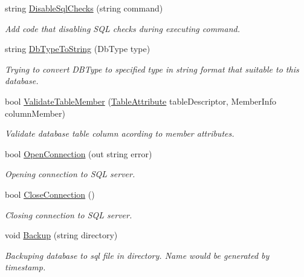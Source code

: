 \begin{DoxyCompactItemize}
string \mbox{\hyperlink{interface_uniform_data_operator_1_1_sql_1_1_i_sql_operator_a0757f304a24ffaa743e23e8bdd210950}{Disable\+Sql\+Checks}} (string command)
\begin{DoxyCompactList}\small\item\em Add code that disabling S\+QL checks during executing command. \end{DoxyCompactList}\item 
string \mbox{\hyperlink{interface_uniform_data_operator_1_1_sql_1_1_i_sql_operator_a51af40df39808d53cdcc81852b836634}{Db\+Type\+To\+String}} (Db\+Type type)
\begin{DoxyCompactList}\small\item\em Trying to convert D\+B\+Type to specified type in string format that suitable to this database. \end{DoxyCompactList}\item 
bool \mbox{\hyperlink{interface_uniform_data_operator_1_1_sql_1_1_i_sql_operator_ac8df6e071646a229acd4781c80d43b68}{Validate\+Table\+Member}} (\mbox{\hyperlink{class_uniform_data_operator_1_1_sql_1_1_markup_1_1_table_attribute}{Table\+Attribute}} table\+Descriptor, Member\+Info column\+Member)
\begin{DoxyCompactList}\small\item\em Validate database table column acording to member attributes. \end{DoxyCompactList}\item 
bool \mbox{\hyperlink{interface_uniform_data_operator_1_1_sql_1_1_i_sql_operator_a6fc9e5efd1e21ae9998b9c56ae9e347c}{Open\+Connection}} (out string error)
\begin{DoxyCompactList}\small\item\em Opening connection to S\+QL server. \end{DoxyCompactList}\item 
bool \mbox{\hyperlink{interface_uniform_data_operator_1_1_sql_1_1_i_sql_operator_a1a6429996e1bbb452f4e034fd634e640}{Close\+Connection}} ()
\begin{DoxyCompactList}\small\item\em Closing connection to S\+QL server. \end{DoxyCompactList}\item 
void \mbox{\hyperlink{interface_uniform_data_operator_1_1_sql_1_1_i_sql_operator_a096be4f746c1fcbb8b2894c2517b937c}{Backup}} (string directory)
\begin{DoxyCompactList}\small\item\em Backuping database to sql file in directory. Name would be generated by timestamp. \end{DoxyCompactList}\item 

\end{DoxyCompactItemize}
